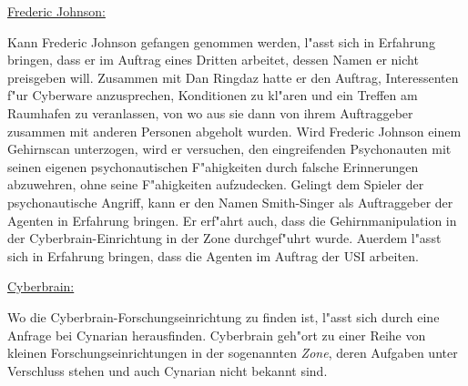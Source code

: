 \begin{remarks}
	\underline{Frederic Johnson:}

	Kann Frederic Johnson gefangen genommen werden, l"asst sich in Erfahrung bringen, dass er im Auftrag eines Dritten arbeitet, dessen Namen er nicht preisgeben will. Zusammen mit Dan Ringdaz hatte er den Auftrag, Interessenten f"ur Cyberware anzusprechen, Konditionen zu kl"aren und ein Treffen am Raumhafen zu veranlassen, von wo aus sie dann von ihrem Auftraggeber zusammen mit anderen Personen abgeholt wurden. Wird Frederic Johnson einem Gehirnscan unterzogen, wird er versuchen, den eingreifenden Psychonauten mit seinen eigenen psychonautischen F"ahigkeiten durch falsche Erinnerungen abzuwehren, ohne seine F"ahigkeiten aufzudecken. Gelingt dem Spieler der psychonautische Angriff, kann er den Namen Smith-Singer als Auftraggeber der Agenten in Erfahrung bringen. Er erf"ahrt auch, dass die Gehirnmanipulation in der Cyberbrain-Einrichtung in der Zone durchgef"uhrt wurde. Au\3erdem l"asst sich in Erfahrung bringen, dass die Agenten im Auftrag der USI arbeiten.	

	\underline{Cyberbrain:}

	Wo die Cyberbrain-Forschungseinrichtung zu finden ist, l"asst sich durch eine Anfrage bei Cynarian herausfinden. Cyberbrain geh"ort zu einer Reihe von kleinen Forschungseinrichtungen in der sogenannten \emph{Zone}, deren Aufgaben unter Verschluss stehen und auch Cynarian nicht bekannt sind.
\end{remarks}
